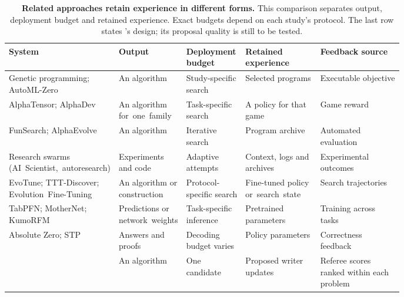 \begin{table}[t]
\caption{\textbf{Related approaches retain experience in different forms.}
This comparison separates output, deployment budget and retained
experience. Exact budgets depend on each study's protocol. The last row states
\EZ{}'s design; its proposal quality is still to be tested.}
\label{tab:roads}
\centering
\small
\setlength{\tabcolsep}{4pt}
\setlength{\extrarowheight}{2pt}%
\begin{tabularx}{\linewidth}{@{}>{\raggedright\arraybackslash}p{0.2615\linewidth}
                >{\raggedright\arraybackslash}p{0.17\linewidth}
                >{\raggedright\arraybackslash}p{0.155\linewidth}
                >{\raggedright\arraybackslash}p{0.19\linewidth}
                >{\raggedright\arraybackslash}X@{}}
\toprule
System & Output & Deployment budget & Retained experience & Feedback source \\
\midrule
Genetic programming; AutoML-Zero
  & An algorithm & Study-specific search & Selected programs
  & Executable objective \\
AlphaTensor; AlphaDev
  & An algorithm \mbox{for one family} & Task-specific search
  & A policy for that game & Game reward \\
FunSearch; AlphaEvolve
  & An algorithm & Iterative search & Program archive
  & Automated evaluation \\
Research swarms \mbox{(AI Scientist, autoresearch)}
  & Experiments and code & Adaptive attempts & Context, logs and archives
  & Experimental outcomes \\
EvoTune; TTT-Discover; \mbox{Evolution Fine-Tuning}
  & An algorithm or construction & Protocol-specific search
  & Fine-tuned policy \mbox{or search state}
  & Search trajectories \\
TabPFN; MotherNet; KumoRFM
  & Predictions or \mbox{network weights} & Task-specific inference
  & Pretrained parameters & Training across tasks \\
Absolute Zero; STP
  & Answers and proofs & Decoding budget varies & Policy parameters
  & Correctness feedback \\
\midrule
\EZ{}
  & An algorithm & One candidate
  & Proposed writer updates
  & Referee scores ranked within each problem \\
\bottomrule
\end{tabularx}
\end{table}

